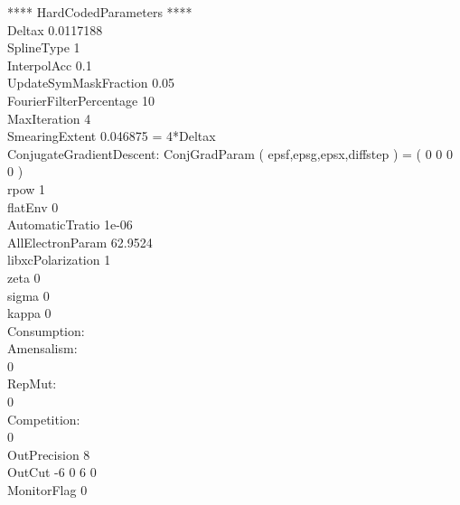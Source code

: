 \documentclass[a4paper,10pt]{article}
\begin{document}
**** HardCodedParameters ****\\Deltax 0.0117188\\SplineType 1\\InterpolAcc 0.1\\UpdateSymMaskFraction 0.05\\FourierFilterPercentage 10\\MaxIteration 4\\SmearingExtent 0.046875 = 4*Deltax\\ConjugateGradientDescent: ConjGradParam ( epsf,epsg,epsx,diffstep ) = ( 0 0 0 0 )\\rpow 1\\flatEnv 0\\AutomaticTratio 1e-06\\AllElectronParam 62.9524\\libxcPolarization 1\\zeta 0\\sigma 0\\kappa 0\\Consumption:\\Amensalism:\\0 \\RepMut:\\0 \\Competition:\\0 \\OutPrecision 8\\OutCut -6 0 6 0 \\MonitorFlag 0\\\newpage 
\end{document}
